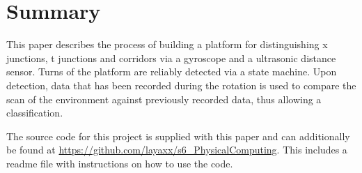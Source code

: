 \section{Summary}
\label{sec:summary}

This paper describes the process of building a platform for distinguishing x junctions, t junctions and corridors via a gyroscope and a ultrasonic distance sensor.
Turns of the platform are reliably detected via a state machine.
Upon detection, data that has been recorded during the rotation is used to compare the scan of the environment against previously recorded data, thus allowing a classification.

The source code for this project is supplied with this paper and can additionally be found at \url{https://github.com/layaxx/s6_PhysicalComputing}. This includes a readme file with instructions on how to use the code.